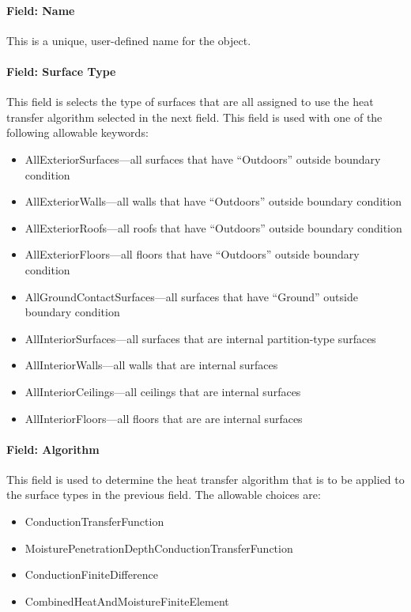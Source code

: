 \paragraph{Field: Name}\label{field-name-000}

This is a unique, user-defined name for the object.

\paragraph{Field: Surface Type}\label{field-surface-type}

This field is selects the type of surfaces that are all assigned to use the heat transfer algorithm selected in the next field. This field is used with one of the following allowable keywords:

\begin{itemize}
\item
  AllExteriorSurfaces---all surfaces that have ``Outdoors'' outside boundary condition
\item
  AllExteriorWalls---all walls that have ``Outdoors'' outside boundary condition
\item
  AllExteriorRoofs---all roofs that have ``Outdoors'' outside boundary condition
\item
  AllExteriorFloors---all floors that have ``Outdoors'' outside boundary condition
\item
  AllGroundContactSurfaces---all surfaces that have ``Ground'' outside boundary condition
\item
  AllInteriorSurfaces---all surfaces that are internal partition-type surfaces
\item
  AllInteriorWalls---all walls that are internal surfaces
\item
  AllInteriorCeilings---all ceilings that are internal surfaces
\item
  AllInteriorFloors---all floors that are are internal surfaces
\end{itemize}

\paragraph{Field: Algorithm}\label{field-algorithm-1}

This field is used to determine the heat transfer algorithm that is to be applied to the surface types in the previous field. The allowable choices are:

\begin{itemize}
\item
  ConductionTransferFunction
\item
  MoisturePenetrationDepthConductionTransferFunction
\item
  ConductionFiniteDifference
\item
  CombinedHeatAndMoistureFiniteElement
\end{itemize}

